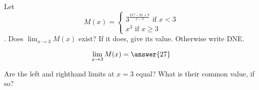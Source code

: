 \documentclass{ximera}
\author{Steven Gubkin}
\begin{document}
\begin{exercise}

Let \[M(x) = \begin{cases} 3^{\frac{2x^2 - 9x+9}{x-3}} \text{ if $x<3$} \\ x^3 \text{ if $x \geq 3$}  \end{cases}\].  Does $\lim_{x \to 3} M(x)$ exist?   If it does, give its value.  Otherwise write DNE.
	
	\[\lim_{x \to  3} M(x) = \answer{27}\]
 
 \begin{hint}
	Are the left and righthand limits at $x=3$ equal? What is their common value, if so?
 \end{hint}
\end{exercise}
\end{document}
